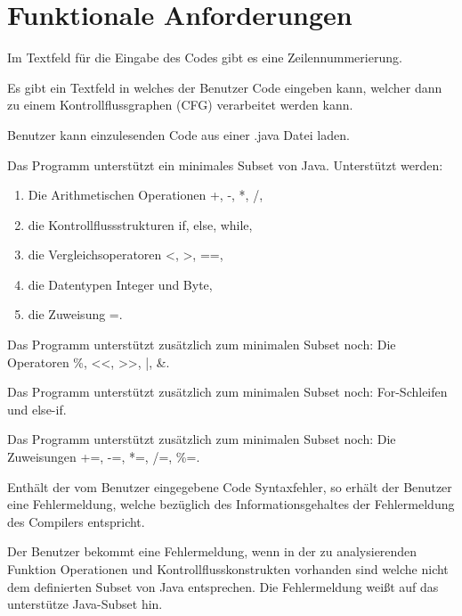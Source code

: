 
\section{Funktionale Anforderungen}

Im Textfeld für die Eingabe des Codes gibt es eine Zeilennummerierung.

Es gibt ein Textfeld in welches der Benutzer Code eingeben kann, welcher dann zu einem Kontrollflussgraphen (CFG) verarbeitet werden kann.

Benutzer kann einzulesenden Code aus einer .java Datei laden.

Das Programm unterstützt ein minimales Subset von Java.
Unterstützt werden:
\begin{enumerate}[label=(\alph*)]
\item Die Arithmetischen Operationen +, -, *, /,
\item die Kontrollflussstrukturen if, else, while,
\item die Vergleichsoperatoren <, >, ==,
\item die Datentypen Integer und Byte,
\item die Zuweisung =.
\end{enumerate}

Das Programm unterstützt zusätzlich zum minimalen Subset noch:
Die Operatoren \%, <<, >>, |, \&.

Das Programm unterstützt zusätzlich zum minimalen Subset noch:
For-Schleifen und else-if.

Das Programm unterstützt zusätzlich zum minimalen Subset noch:
Die Zuweisungen +=, -=, *=, /=, \%=.

Enthält der vom Benutzer eingegebene Code Syntaxfehler, so erhält der Benutzer eine Fehlermeldung, welche bezüglich des Informationsgehaltes der Fehlermeldung des Compilers entspricht.

Der Benutzer bekommt eine Fehlermeldung, wenn in der zu analysierenden Funktion Operationen und Kontrollflusskonstrukten vorhanden sind welche nicht dem definierten Subset von Java entsprechen. Die Fehlermeldung weißt auf das unterstütze Java-Subset hin.

